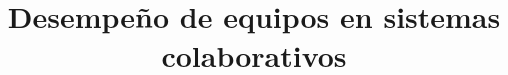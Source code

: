 \documentclass[12pt,letterpaper,spanish]{article}
\begin{document}
\title{Desempeño de equipos en sistemas colaborativos}

\marginsize{2.5cm}{2.5cm}{3cm}{3cm}
\tableofcontents
\newpage




\newpage
%


\end{document}
